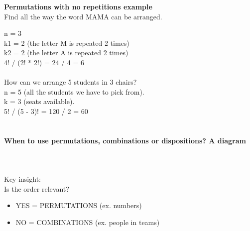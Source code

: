 \documentclass{article}
\begin{document}
\textbf{Permutations with no repetitions example} \\
Find all the way the word MAMA can be arranged. 

n = 3 \\ 
k1 = 2 (the letter M is repeated 2 times) \\
k2 = 2 (the letter A is repeated 2 times) \\ 
4! / (2! * 2!) = 24 / 4 = 6 \mbox{} \\
\mbox{} \\
How can we arrange 5 students in 3 chairs? \\ 

n = 5 (all the students we have to pick from). \\
k = 3 (seats available). \\
5! / (5 - 3)! = 120 / 2 = 60 \mbox{} \\
\mbox{} \\

\paragraph{When to use permutations, combinations or dispositions? A diagram}\mbox{} \\
\mbox{} \\
Key insight: \\ 
Is the order relevant?
\begin{itemize}
    \item YES = PERMUTATIONS (ex. numbers)
    \item NO = COMBINATIONS (ex. people in teams)
\end{itemize}
\end{document}
